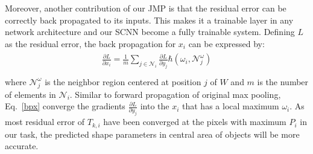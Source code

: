 Moreover, another contribution of our JMP is that the residual error can be correctly back propagated to its inputs.
This makes it a trainable layer in any network architecture and our SCNN become a fully trainable system.
Defining $L$ as the residual error, the back propagation for $x_{i}$ can be expressed by:
\begin{eqnarray}\label{bpx}
\begin{aligned}
\frac{\partial L}{\partial x_{i}}=\frac{1}{m}\sum\limits_{j\in\mathcal{N}_{i}}\frac{\partial L}{\partial y_{j}}\hbar(\omega_{i},{\mathcal{N}}^{\omega}_{j})\\
\end{aligned}
\end{eqnarray}
where $\mathcal{N}^{\omega}_{j}$ is the neighbor region centered at position $j$ of $W$ and $m$ is the number of elements in $\mathcal{N}_{i}$.
Similar to forward propagation of original max pooling, Eq.~\ref{bpx} converge the gradients $\frac{\partial L}{\partial y_{j}}$ into the $x_{i}$ that has a local maximum $\omega_{i}$.
As most residual error of $T_{k,i}$ have been converged at the pixels with maximum $P_i$ in our task, the predicted shape parameters in central area of objects will be more accurate.


